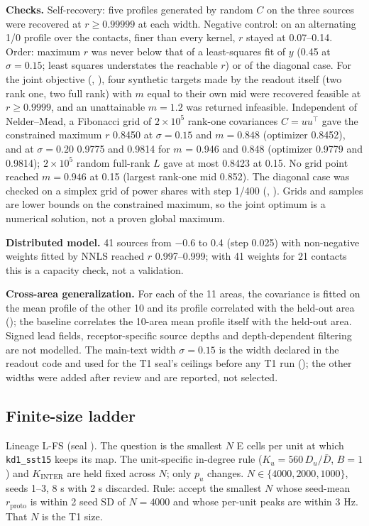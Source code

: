 \textbf{Checks.} Self-recovery: five profiles generated by random $C$ on the three sources were recovered at
$r \geq 0.99999$ at each width. Negative control: on an alternating 1/0 profile over the contacts, finer than every
kernel, $r$ stayed at 0.07--0.14. Order: maximum $r$ was never below that of a least-squares fit of $y$ (0.45 at
$\sigma = 0.15$; least squares understates the reachable $r$) or of the diagonal case. For the joint objective
(, ), four synthetic targets made by the readout itself (two rank one, two full rank) with $m$
equal to their own mid were recovered feasible at $r \geq 0.9999$, and an unattainable $m = 1.2$ was returned
infeasible. Independent of Nelder--Mead, a Fibonacci grid of $2\times10^5$ rank-one covariances $C = uu^\top$ gave
the constrained maximum $r$ 0.8450 at $\sigma = 0.15$ and $m = 0.848$ (optimizer 0.8452), and at $\sigma = 0.20$
0.9775 and 0.9814 for $m$ = 0.946 and 0.848 (optimizer 0.9779 and 0.9814); $2\times10^5$ random full-rank $L$ gave
at most 0.8423 at 0.15. No grid point reached $m = 0.946$ at 0.15 (largest rank-one mid 0.852). The diagonal case
was checked on a simplex grid of power shares with step 1/400 (, ). Grids and samples are lower
bounds on the constrained maximum, so the joint optimum is a numerical solution, not a proven global maximum.

\textbf{Distributed model.} 41 sources from $-0.6$ to 0.4 (step 0.025) with non-negative weights fitted by NNLS
reached $r$ 0.997--0.999; with 41 weights for 21 contacts this is a capacity check, not a validation.

\textbf{Cross-area generalization.} For each of the 11 areas, the covariance is fitted on the mean profile of the
other 10 and its profile correlated with the held-out area (); the baseline correlates the 10-area mean
profile itself with the held-out area. Signed lead fields, receptor-specific source depths and depth-dependent
filtering are not modelled. The main-text width $\sigma = 0.15$ is the width declared in the readout code and used
for the T1 seal's ceilings before any T1 run (); the other widths were added after review and are reported,
not selected.

\subsection{Finite-size ladder}

Lineage L-FS (seal ). The question is the smallest $N$ E cells per unit at which
\texttt{kd1\_sst15} keeps its map. The unit-specific in-degree rule ($K_u = 560\,D_u/\bar D$, $B = 1$) and $K_\text{INTER}$
are held fixed across $N$; only $p_u$ changes. $N \in \{4000, 2000, 1000\}$,
seeds 1--3, 8 s with 2 s discarded. Rule: accept the smallest $N$ whose seed-mean $r_\text{proto}$ is within
2 seed SD of $N = 4000$ and whose per-unit peaks are within 3 Hz. That $N$ is the T1 size.


